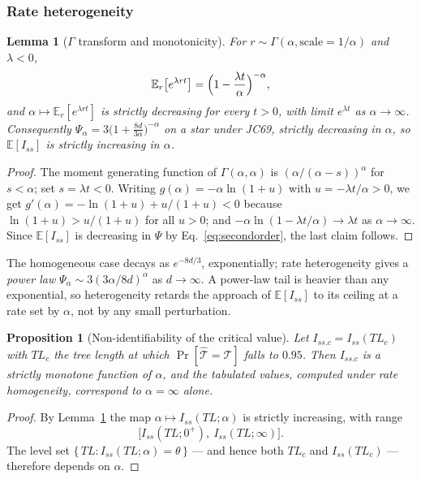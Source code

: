 \documentclass[11pt]{article}
\newcommand{\Iss}{I_{ss}}
\newcommand{\Issc}{I_{ss.c}}
\newcommand{\E}{\mathbb{E}}
\newtheorem{lemma}[theorem]{Lemma}
\newtheorem{proposition}[theorem]{Proposition}
\theoremstyle{definition}
\theoremstyle{remark}
\begin{document}
\subsubsection*{Rate heterogeneity}

\begin{lemma}[$\Gamma$ transform and monotonicity]
\label{lem:gamma-monotone}
For $r\sim\Gamma(\alpha,\text{scale}=1/\alpha)$ and $\lambda<0$,
\begin{equation}
  \E_r\bigl[e^{\lambda rt}\bigr]=\Bigl(1-\frac{\lambda t}{\alpha}\Bigr)^{-\alpha},
\end{equation}
and $\alpha\mapsto\E_r[e^{\lambda rt}]$ is strictly decreasing for every
$t>0$, with limit $e^{\lambda t}$ as $\alpha\to\infty$. Consequently
$\Psi_\alpha=3\bigl(1+\frac{8d}{3\alpha}\bigr)^{-\alpha}$ on a star under
JC69, strictly decreasing in $\alpha$, so $\E[\Iss]$ is strictly increasing
in $\alpha$.
\end{lemma}

\begin{proof}
The moment generating function of $\Gamma(\alpha,\alpha)$ is
$(\alpha/(\alpha-s))^{\alpha}$ for $s<\alpha$; set $s=\lambda t<0$. Writing
$g(\alpha)=-\alpha\ln(1+u)$ with $u=-\lambda t/\alpha>0$, we get
$g'(\alpha)=-\ln(1+u)+u/(1+u)<0$ because $\ln(1+u)>u/(1+u)$ for all $u>0$;
and $-\alpha\ln(1-\lambda t/\alpha)\to\lambda t$ as $\alpha\to\infty$. Since
$\E[\Iss]$ is decreasing in $\Psi$ by Eq.~\eqref{eq:secondorder}, the last
claim follows.
\end{proof}

The homogeneous case decays as $e^{-8d/3}$, exponentially; rate heterogeneity
gives a \emph{power law} $\Psi_\alpha\sim3(3\alpha/8d)^{\alpha}$ as
$d\to\infty$. A power-law tail is heavier than any exponential, so
heterogeneity retards the approach of $\E[\Iss]$ to its ceiling at a rate set
by $\alpha$, not by any small perturbation.

\begin{proposition}[Non-identifiability of the critical value]
\label{prop:nonident}
Let $\Issc=\Iss(TL_c)$ with $TL_c$ the tree length at which
$\Pr[\hat{\mathcal T}=\mathcal T]$ falls to $0.95$. Then $\Issc$ is a strictly
monotone function of $\alpha$, and the tabulated values, computed under rate
homogeneity, correspond to $\alpha=\infty$ alone.
\end{proposition}

\begin{proof}
By Lemma~\ref{lem:gamma-monotone} the map $\alpha\mapsto\Iss(TL;\alpha)$ is
strictly increasing, with range
\[
  \bigl[\Iss(TL;0^+),\ \Iss(TL;\infty)\bigr].
\]
The level set $\{\,TL:\Iss(TL;\alpha)=\theta\,\}$ --- and hence both $TL_c$
and $\Iss(TL_c)$ --- therefore depends on $\alpha$.
\end{proof}
\end{document}
